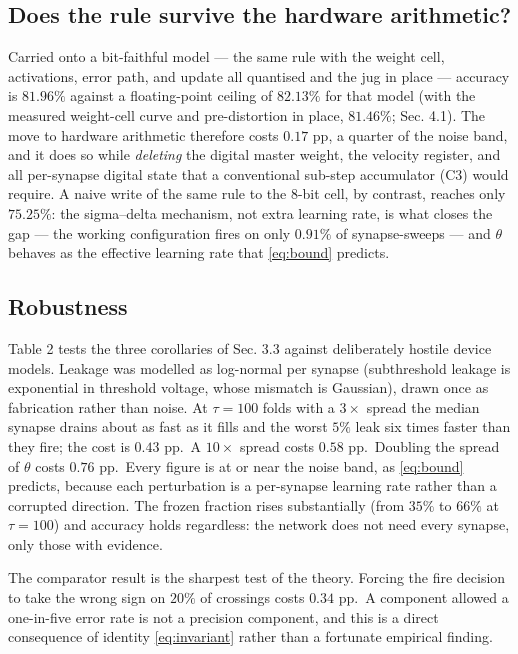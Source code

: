 \documentclass[11pt]{article}
\begin{document}
\hypertarget{does-the-rule-survive-the-hardware-arithmetic}{%
\subsection{Does the rule survive the hardware
arithmetic?}\label{does-the-rule-survive-the-hardware-arithmetic}}

Carried onto a bit-faithful model --- the same rule with the weight
cell, activations, error path, and update all quantised and the jug in
place --- accuracy is \(81.96\%\) against a floating-point ceiling of
\(82.13\%\) for that model (with the measured weight-cell curve and
pre-distortion in place, \(81.46\%\); Sec. 4.1). The move to hardware
arithmetic therefore costs \(0.17\) pp, a quarter of the noise band, and
it does so while \emph{deleting} the digital master weight, the velocity
register, and all per-synapse digital state that a conventional sub-step
accumulator (C3) would require. A naive write of the same rule to the
8-bit cell, by contrast, reaches only \(75.25\%\): the sigma--delta
mechanism, not extra learning rate, is what closes the gap --- the
working configuration fires on only \(0.91\%\) of synapse-sweeps --- and
\(\theta\) behaves as the effective learning rate that \eqref{eq:bound} predicts.

\hypertarget{robustness}{%
\subsection{Robustness}\label{robustness}}

Table 2 tests the three corollaries of Sec. 3.3 against deliberately
hostile device models. Leakage was modelled as log-normal per synapse
(subthreshold leakage is exponential in threshold voltage, whose
mismatch is Gaussian), drawn once as fabrication rather than noise. At
\(\tau = 100\) folds with a \(3\times\) spread the median synapse drains
about as fast as it fills and the worst \(5\%\) leak six times faster
than they fire; the cost is \(0.43\) pp.~A \(10\times\) spread costs
\(0.58\) pp.~Doubling the spread of \(\theta\) costs \(0.76\) pp.~Every
figure is at or near the noise band, as \eqref{eq:bound} predicts, because each
perturbation is a per-synapse learning rate rather than a corrupted
direction. The frozen fraction rises substantially (from \(35\%\) to
\(66\%\) at \(\tau=100\)) and accuracy holds regardless: the network
does not need every synapse, only those with evidence.

The comparator result is the sharpest test of the theory. Forcing the
fire decision to take the wrong sign on \(20\%\) of crossings costs
\(0.34\) pp.~A component allowed a one-in-five error rate is not a
precision component, and this is a direct consequence of identity \eqref{eq:invariant}
rather than a fortunate empirical finding.
\end{document}
